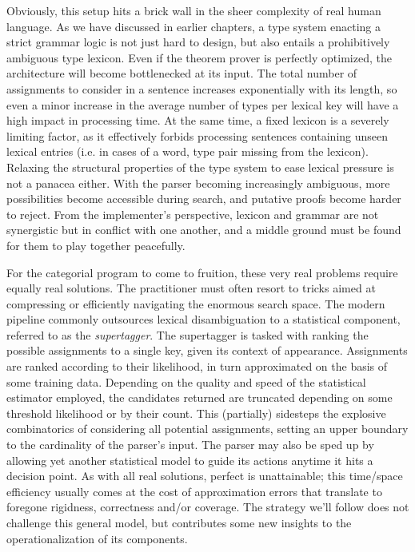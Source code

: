 Obviously, this setup hits a brick wall in the sheer complexity of real human language.
As we have discussed in earlier chapters, a type system enacting a strict grammar logic is not just hard to design, but also entails a prohibitively ambiguous type lexicon.
Even if the theorem prover is perfectly optimized, the architecture will become bottlenecked at its input.
The total number of assignments to consider in a sentence increases exponentially with its length, so even a minor increase in the average number of types per lexical key will have a high impact in processing time.
At the same time, a fixed lexicon is a severely limiting factor, as it effectively forbids processing sentences containing unseen lexical entries (i.e. in cases of a \textlangle word, type\textrangle{} pair missing from the lexicon).
Relaxing the structural properties of the type system to ease lexical pressure is not a panacea either.
With the parser becoming increasingly ambiguous, more possibilities become accessible during search, and putative proofs become harder to reject.
From the implementer's perspective, lexicon and grammar are not synergistic but in conflict with one another, and a middle ground must be found for them to play together peacefully.

For the categorial program to come to fruition, these very real problems require equally real solutions.
The practitioner must often resort to tricks aimed at compressing or efficiently navigating the enormous search space.
The modern pipeline commonly outsources lexical disambiguation to a statistical component, referred to as the \textit{supertagger}.
The supertagger is tasked with ranking the possible assignments to a single key, given its context of appearance.
Assignments are ranked according to their likelihood, in turn approximated on the basis of some training data.
Depending on the quality and speed of the statistical estimator employed, the candidates returned are truncated depending on some threshold likelihood or by their count.
This (partially) sidesteps the explosive combinatorics of considering all potential assignments, setting an upper boundary to the cardinality of the parser's input.
The parser may also be sped up by allowing yet another statistical model to guide its actions anytime it hits a decision point.
As with all real solutions, perfect is unattainable; this time/space efficiency usually comes at the cost of approximation errors that translate to foregone rigidness, correctness and/or coverage.
The strategy we'll follow does not challenge this general model, but contributes some new insights to the operationalization of its components.

